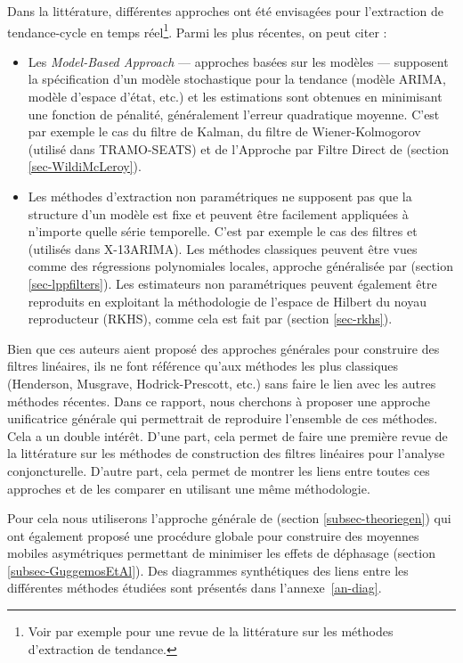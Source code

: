 \documentclass[
  11pt,
  french,
  a4paper]{article}
\newcommand\1{\mathds{1}}
\begin{document}
Dans la littérature, différentes approches ont été envisagées pour l'extraction de tendance-cycle en temps réel\footnote{Voir par exemple \textcite{alexandrov2012TEreview} pour une revue de la littérature sur les méthodes d'extraction de tendance.}.
Parmi les plus récentes, on peut citer :

\begin{itemize}
\item
  Les \emph{Model-Based Approach} --- approches basées sur les modèles --- supposent la spécification d'un modèle stochastique pour la tendance (modèle ARIMA, modèle d'espace d'état, etc.) et les estimations sont obtenues en minimisant une fonction de pénalité, généralement l'erreur quadratique moyenne.
  C'est par exemple le cas du filtre de Kalman, du filtre de Wiener-Kolmogorov (utilisé dans TRAMO-SEATS) et de l'Approche par Filtre Direct de \textcite{trilemmaWMR2019} (section \ref{sec-WildiMcLeroy}).
\item
  Les méthodes d'extraction non paramétriques ne supposent pas que la structure d'un modèle est fixe et peuvent être facilement appliquées à n'importe quelle série temporelle.
  C'est par exemple le cas des filtres \textcite{henderson1916note} et \textcite{musgrave1964set} (utilisés dans X-13ARIMA).
  Les méthodes classiques peuvent être vues comme des régressions polynomiales locales, approche généralisée par \textcite{proietti2008} (section \ref{sec-lppfilters}).
  Les estimateurs non paramétriques peuvent également être reproduits en exploitant la méthodologie de l'espace de Hilbert du noyau reproducteur (RKHS), comme cela est fait par
  \textcite{dagumbianconcini2008} (section \ref{sec-rkhs}).
\end{itemize}

Bien que ces auteurs aient proposé des approches générales pour construire des filtres linéaires, ils ne font référence qu'aux méthodes les plus classiques (Henderson, Musgrave, Hodrick-Prescott, etc.) sans faire le lien avec les autres méthodes récentes.
Dans ce rapport, nous cherchons à proposer une approche unificatrice générale qui permettrait de reproduire l'ensemble de ces méthodes.
Cela a un double intérêt.
D'une part, cela permet de faire une première revue de la littérature sur les méthodes de construction des filtres linéaires pour l'analyse conjoncturelle.
D'autre part, cela permet de montrer les liens entre toutes ces approches et de les comparer en utilisant une même méthodologie.

Pour cela nous utiliserons l'approche générale de \textcite{ch15HBSA} (section \ref{subsec-theoriegen}) qui ont également proposé une procédure globale pour construire des moyennes mobiles asymétriques permettant de minimiser les effets de déphasage (section \ref{subsec-GuggemosEtAl}).
Des diagrammes synthétiques des liens entre les différentes méthodes étudiées sont présentés dans l'annexe~\ref{an-diag}.
\end{document}

